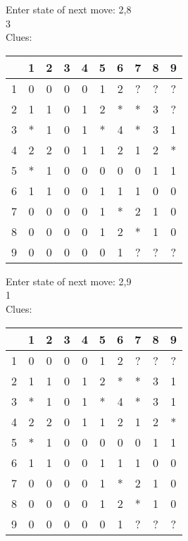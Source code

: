 Enter state of next move: 2,8\\
3\\
Clues:\\
\begin{tabular}{|c|c|c|c|c|c|c|c|c|c|}
\hline
  & 1 & 2 & 3 & 4 & 5 & 6 & 7 & 8 & 9\\
\hline
1 & 0 & 0 & 0 & 0 & 1 & 2 & ? & ? & ?\\
\hline
2 & 1 & 1 & 0 & 1 & 2 & * & * & 3 & ?\\
\hline
3 & * & 1 & 0 & 1 & * & 4 & * & 3 & 1\\
\hline
4 & 2 & 2 & 0 & 1 & 1 & 2 & 1 & 2 & *\\
\hline
5 & * & 1 & 0 & 0 & 0 & 0 & 0 & 1 & 1\\
\hline
6 & 1 & 1 & 0 & 0 & 1 & 1 & 1 & 0 & 0\\
\hline
7 & 0 & 0 & 0 & 0 & 1 & * & 2 & 1 & 0\\
\hline
8 & 0 & 0 & 0 & 0 & 1 & 2 & * & 1 & 0\\
\hline
9 & 0 & 0 & 0 & 0 & 0 & 1 & ? & ? & ?\\
\hline
\end{tabular}

Enter state of next move: 2,9\\
1\\
Clues:\\
\begin{tabular}{|c|c|c|c|c|c|c|c|c|c|}
\hline
  & 1 & 2 & 3 & 4 & 5 & 6 & 7 & 8 & 9\\
\hline
1 & 0 & 0 & 0 & 0 & 1 & 2 & ? & ? & ?\\
\hline
2 & 1 & 1 & 0 & 1 & 2 & * & * & 3 & 1\\
\hline
3 & * & 1 & 0 & 1 & * & 4 & * & 3 & 1\\
\hline
4 & 2 & 2 & 0 & 1 & 1 & 2 & 1 & 2 & *\\
\hline
5 & * & 1 & 0 & 0 & 0 & 0 & 0 & 1 & 1\\
\hline
6 & 1 & 1 & 0 & 0 & 1 & 1 & 1 & 0 & 0\\
\hline
7 & 0 & 0 & 0 & 0 & 1 & * & 2 & 1 & 0\\
\hline
8 & 0 & 0 & 0 & 0 & 1 & 2 & * & 1 & 0\\
\hline
9 & 0 & 0 & 0 & 0 & 0 & 1 & ? & ? & ?\\
\hline
\end{tabular}

